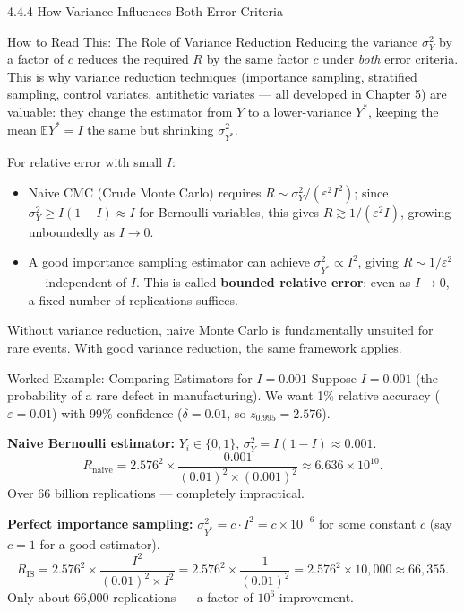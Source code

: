 \documentclass[aspectratio=169,10pt]{beamer}
\begin{document}
\begin{frame}[allowframebreaks]{4.4.4 How Variance Influences Both Error Criteria}
\framebreak

\begin{alertblock}{How to Read This: The Role of Variance Reduction}
  Reducing the variance $\sigma_Y^2$ by a factor of $c$ reduces the required $R$
  by the same factor $c$ under \emph{both} error criteria.  This is why variance
  reduction techniques (importance sampling, stratified sampling, control variates,
  antithetic variates --- all developed in Chapter 5) are valuable: they change the
  estimator from $Y$ to a lower-variance $Y^*$, keeping the mean $\mathbb{E}Y^* = I$
  the same but shrinking $\sigma_{Y^*}^2$.

  For relative error with small $I$:
  \begin{itemize}
    \item Naive CMC (Crude Monte Carlo) requires $R \sim \sigma_Y^2/(\varepsilon^2 I^2)$;
      since $\sigma_Y^2 \geq I(1-I) \approx I$ for Bernoulli variables, this gives
      $R \gtrsim 1/(\varepsilon^2 I)$, growing unboundedly as $I \to 0$.
    \item A good importance sampling estimator can achieve
      $\sigma_{Y^*}^2 \propto I^2$, giving $R \sim 1/\varepsilon^2$ --- independent
      of $I$.  This is called \textbf{bounded relative error}: even as $I \to 0$,
      a fixed number of replications suffices.
  \end{itemize}
  Without variance reduction, naive Monte Carlo is fundamentally unsuited for
  rare events.  With good variance reduction, the same framework applies.
\end{alertblock}

\begin{exampleblock}{Worked Example: Comparing Estimators for $I = 0.001$}
  Suppose $I = 0.001$ (the probability of a rare defect in manufacturing).
  We want 1\% relative accuracy ($\varepsilon = 0.01$) with 99\% confidence
  ($\delta = 0.01$, so $z_{0.995} = 2.576$).

  \textbf{Naive Bernoulli estimator:} $Y_i \in \{0,1\}$, $\sigma_Y^2 = I(1-I) \approx 0.001$.
  \[
    R_{\mathrm{naive}} = 2.576^2 \times \frac{0.001}{(0.01)^2 \times (0.001)^2}
      \approx 6.636 \times 10^{10}.
  \]
  Over 66 billion replications --- completely impractical.

  \textbf{Perfect importance sampling:} $\sigma_{Y^*}^2 = c \cdot I^2 = c \times 10^{-6}$
  for some constant $c$ (say $c = 1$ for a good estimator).
  \[
    R_{\mathrm{IS}} = 2.576^2 \times \frac{I^2}{(0.01)^2 \times I^2}
      = 2.576^2 \times \frac{1}{(0.01)^2}
      = 2.576^2 \times 10{,}000
      \approx 66{,}355.
  \]
  Only about 66,000 replications --- a factor of $10^6$ improvement.
\end{exampleblock}

\end{frame}
\end{document}
